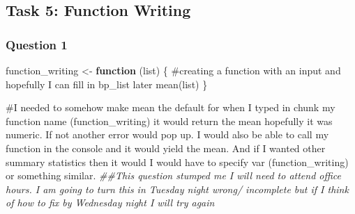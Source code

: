 \documentclass[
  letterpaper,
  DIV=11,
  numbers=noendperiod]{scrartcl}
\newenvironment{Shaded}{\begin{snugshade}}{\end{snugshade}}
\newcommand{\CommentTok}[1]{\textcolor[rgb]{0.37,0.37,0.37}{#1}}
\newcommand{\ControlFlowTok}[1]{\textcolor[rgb]{0.00,0.23,0.31}{\textbf{#1}}}
\newcommand{\DecValTok}[1]{\textcolor[rgb]{0.68,0.00,0.00}{#1}}
\newcommand{\DocumentationTok}[1]{\textcolor[rgb]{0.37,0.37,0.37}{\textit{#1}}}
\newcommand{\FunctionTok}[1]{\textcolor[rgb]{0.28,0.35,0.67}{#1}}
\newcommand{\NormalTok}[1]{\textcolor[rgb]{0.00,0.23,0.31}{#1}}
\newcommand{\OtherTok}[1]{\textcolor[rgb]{0.00,0.23,0.31}{#1}}
\newcommand{\SpecialCharTok}[1]{\textcolor[rgb]{0.37,0.37,0.37}{#1}}
\newcommand{\StringTok}[1]{\textcolor[rgb]{0.13,0.47,0.30}{#1}}
\begin{document}
\begin{Shaded}
\end{Shaded}

\subsection{Task 5: Function Writing}\label{task-5-function-writing}

\subsubsection{Question 1}\label{question-1-3}

\begin{Shaded}
\begin{Highlighting}[]
\NormalTok{function\_writing }\OtherTok{\textless{}{-}} \ControlFlowTok{function}\NormalTok{ (list) \{ }\CommentTok{\#creating a function with an input and hopefully I can fill in bp\_list later}
  \FunctionTok{mean}\NormalTok{(list)}
\NormalTok{\} }


\CommentTok{\#I needed to somehow make mean the default for when I typed in chunk my function name (function\_writing) it would return the mean hopefully it was numeric. If not another error would pop up. I would also be able to call my function in the console and it would yield the mean. And if I wanted other summary statistics then it would I would have to specify var (function\_writing) or something similar.}
\DocumentationTok{\#\#This question stumped me I will need to attend office hours. I am going to turn this in Tuesday night wrong/ incomplete but if I think of how to fix by Wednesday night I will try again}
\end{Highlighting}
\end{Shaded}
\end{document}
